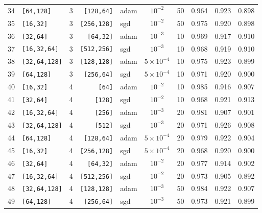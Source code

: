 \begin{table}[htbp]
{\begin{tabular}{rlcrlccrrr}
34 & \texttt{[64,128]} & 3 & \texttt{[128,64]} & adam & $10^{-2}$ & 50 & 0.964 & 0.923 & 0.898 \\
35 & \texttt{[16,32]} & 3 & \texttt{[256,128]} & sgd & $10^{-2}$ & 50 & 0.975 & 0.920 & 0.898 \\
36 & \texttt{[32,64]} & 3 & \texttt{[64,32]} & adam & $10^{-3}$ & 10 & 0.969 & 0.917 & 0.910 \\
37 & \texttt{[16,32,64]} & 3 & \texttt{[512,256]} & sgd & $10^{-3}$ & 10 & 0.968 & 0.919 & 0.910 \\
38 & \texttt{[32,64,128]} & 3 & \texttt{[128,128]} & adam & $5\!\times\!10^{-4}$ & 10 & 0.975 & 0.923 & 0.899 \\
39 & \texttt{[64,128]} & 3 & \texttt{[256,64]} & sgd & $5\!\times\!10^{-4}$ & 10 & 0.971 & 0.920 & 0.900 \\
40 & \texttt{[16,32]} & 4 & \texttt{[64]} & adam & $10^{-2}$ & 10 & 0.985 & 0.916 & 0.907 \\
41 & \texttt{[32,64]} & 4 & \texttt{[128]} & sgd & $10^{-2}$ & 10 & 0.968 & 0.921 & 0.913 \\
42 & \texttt{[16,32,64]} & 4 & \texttt{[256]} & adam & $10^{-3}$ & 20 & 0.981 & 0.907 & 0.901 \\
43 & \texttt{[32,64,128]} & 4 & \texttt{[512]} & sgd & $10^{-3}$ & 20 & 0.971 & 0.926 & 0.908 \\
44 & \texttt{[64,128]} & 4 & \texttt{[128,64]} & adam & $5\!\times\!10^{-4}$ & 20 & 0.979 & 0.922 & 0.904 \\
45 & \texttt{[16,32]} & 4 & \texttt{[256,128]} & sgd & $5\!\times\!10^{-4}$ & 20 & 0.968 & 0.920 & 0.900 \\
46 & \texttt{[32,64]} & 4 & \texttt{[64,32]} & adam & $10^{-2}$ & 20 & 0.977 & 0.914 & 0.902 \\
47 & \texttt{[16,32,64]} & 4 & \texttt{[512,256]} & sgd & $10^{-2}$ & 20 & 0.973 & 0.905 & 0.892 \\
48 & \texttt{[32,64,128]} & 4 & \texttt{[128,128]} & adam & $10^{-3}$ & 50 & 0.984 & 0.922 & 0.907 \\
49 & \texttt{[64,128]} & 4 & \texttt{[256,64]} & sgd & $10^{-3}$ & 50 & 0.973 & 0.921 & 0.899 \\
\bottomrule
\end{tabular}
}
\end{table}
